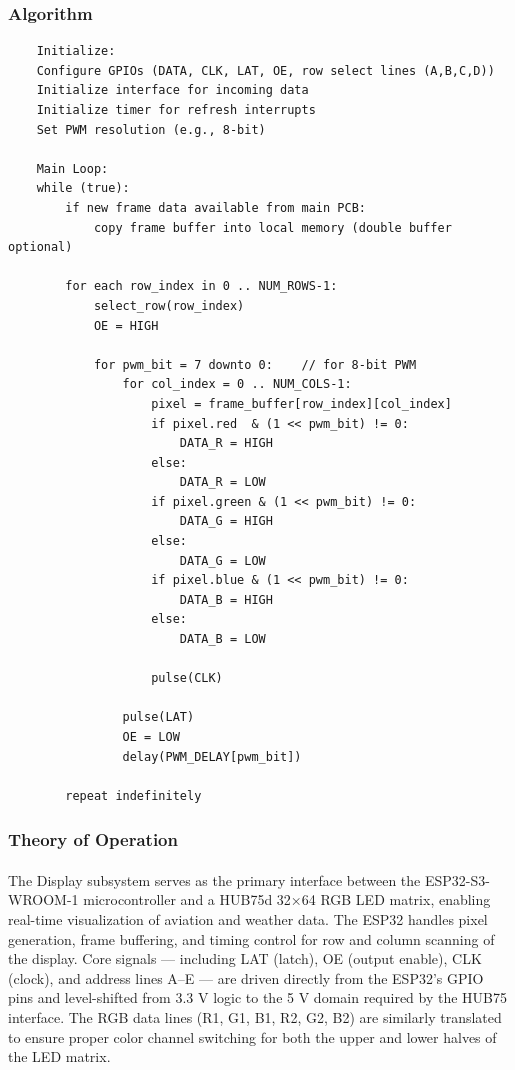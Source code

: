 \subsubsection{Algorithm}

\begin{lstlisting}
    Initialize:
    Configure GPIOs (DATA, CLK, LAT, OE, row select lines (A,B,C,D))
    Initialize interface for incoming data
    Initialize timer for refresh interrupts
    Set PWM resolution (e.g., 8-bit)

    Main Loop:
    while (true):
        if new frame data available from main PCB:
            copy frame buffer into local memory (double buffer optional)
        
        for each row_index in 0 .. NUM_ROWS-1:
            select_row(row_index)        
            OE = HIGH                   
            
            for pwm_bit = 7 downto 0:    // for 8-bit PWM
                for col_index = 0 .. NUM_COLS-1:
                    pixel = frame_buffer[row_index][col_index]
                    if pixel.red  & (1 << pwm_bit) != 0:
                        DATA_R = HIGH
                    else:
                        DATA_R = LOW
                    if pixel.green & (1 << pwm_bit) != 0:
                        DATA_G = HIGH
                    else:
                        DATA_G = LOW
                    if pixel.blue & (1 << pwm_bit) != 0:
                        DATA_B = HIGH
                    else:
                        DATA_B = LOW
                    
                    pulse(CLK)           
                    
                pulse(LAT)                
                OE = LOW                   
                delay(PWM_DELAY[pwm_bit])  
                
        repeat indefinitely
\end{lstlisting}

\subsubsection{Theory of Operation}
\paragraph{}
The Display subsystem serves as the primary interface between the ESP32-S3-WROOM-1 microcontroller and a HUB75d 32×64 RGB LED matrix, enabling real-time visualization of aviation and weather data. 
The ESP32 handles pixel generation, frame buffering, and timing control for row and column scanning of the display. 
Core signals — including LAT (latch), OE (output enable), CLK (clock), and address lines A–E — are driven directly from the ESP32’s GPIO pins and level-shifted from 3.3 V logic to the 5 V domain required by the HUB75 interface. 
The RGB data lines (R1, G1, B1, R2, G2, B2) are similarly translated to ensure proper color channel switching for both the upper and lower halves of the LED matrix. 

